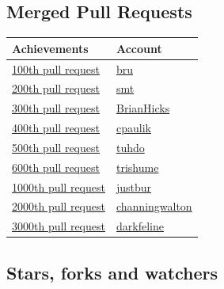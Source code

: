 \documentclass[11pt]{article}
\begin{document}
\subsection{Merged Pull Requests}
\label{sec:org176e199}

\begin{center}
\begin{tabular}{ll}
Achievements & Account\\
\hline
\href{https://github.com/syl20bnr/spacemacs/pull/228}{100th pull request} & \href{https://github.com/bru}{bru}\\
\href{https://github.com/syl20bnr/spacemacs/pull/418}{200th pull request} & \href{https://github.com/smt}{smt}\\
\href{https://github.com/syl20bnr/spacemacs/pull/617}{300th pull request} & \href{https://github.com/BrianHicks}{BrianHicks}\\
\href{https://github.com/syl20bnr/spacemacs/pull/806}{400th pull request} & \href{https://github.com/cpaulik}{cpaulik}\\
\href{https://github.com/syl20bnr/spacemacs/pull/993}{500th pull request} & \href{https://github.com/tuhdo}{tuhdo}\\
\href{https://github.com/syl20bnr/spacemacs/pull/1205}{600th pull request} & \href{https://github.com/trishume}{trishume}\\
\href{https://github.com/syl20bnr/spacemacs/pull/1995}{1000th pull request} & \href{https://github.com/justbur}{justbur}\\
\href{https://github.com/syl20bnr/spacemacs/pull/4089}{2000th pull request} & \href{https://github.com/channingwalton}{channingwalton}\\
\href{https://github.com/syl20bnr/spacemacs/pull/6338}{3000th pull request} & \href{https://github.com/darkfeline}{darkfeline}\\
\end{tabular}
\end{center}

\subsection{Stars, forks and watchers}
\label{sec:orgd59e5d8}
\end{document}
